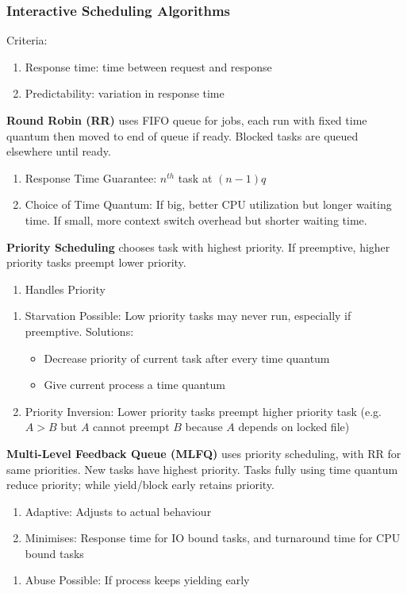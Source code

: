 \documentclass[12pt, a4paper]{article}
\begin{document}
\begin{multicols*}{3}
\subsubsection{Interactive Scheduling Algorithms}
Criteria:
\begin{enumerate}[\roman*.]
  \item Response time: time between request and response
  \item Predictability: variation in response time
\end{enumerate}

\textbf{Round Robin (RR)} uses FIFO queue for jobs, each run with fixed time quantum then moved to end of queue if ready. Blocked tasks are queued elsewhere until ready.
\begin{enumerate}[\roman*.]
  \item Response Time Guarantee: $n^{th}$ task at $(n-1)q$
  \item Choice of Time Quantum: If big, better CPU utilization but longer waiting time. If small, more context switch overhead but shorter waiting time. 
\end{enumerate}

\textbf{Priority Scheduling} chooses task with highest priority. If preemptive, higher priority tasks preempt lower priority.
\begin{enumerate}[$+$]
  \item Handles Priority 
\end{enumerate}\vspace{-1pt}
\begin{enumerate}[$-$]
  \item Starvation Possible: Low priority tasks may never run, especially if preemptive. Solutions:
    \begin{itemize}[leftmargin=*]
      \item Decrease priority of current task after every time quantum 
      \item Give current process a time quantum
    \end{itemize}
  \item Priority Inversion: Lower priority tasks preempt higher priority task (e.g. $A > B$ but $A$ cannot preempt $B$ because $A$ depends on locked file)
\end{enumerate}

\textbf{Multi-Level Feedback Queue (MLFQ)} uses priority scheduling, with RR for same priorities. New tasks have highest priority. Tasks fully using time quantum reduce priority; while yield/block early retains priority. 
\begin{enumerate}[$+$]
  \item Adaptive: Adjusts to actual behaviour
  \item Minimises: Response time for IO bound tasks, and turnaround time for CPU bound tasks
\end{enumerate}\vspace{-1pt}
\begin{enumerate}[$-$]
  \item Abuse Possible: If process keeps yielding early
\end{enumerate}


\end{multicols*}
\end{document}
